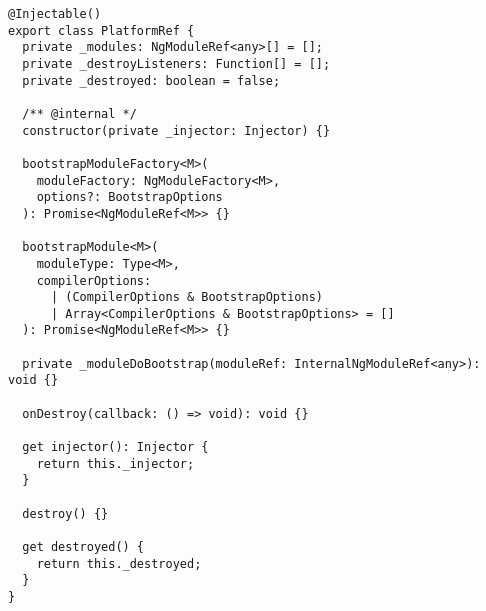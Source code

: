 \begin{verbatim}
@Injectable()
export class PlatformRef {
  private _modules: NgModuleRef<any>[] = [];
  private _destroyListeners: Function[] = [];
  private _destroyed: boolean = false;

  /** @internal */
  constructor(private _injector: Injector) {}

  bootstrapModuleFactory<M>(
    moduleFactory: NgModuleFactory<M>,
    options?: BootstrapOptions
  ): Promise<NgModuleRef<M>> {}

  bootstrapModule<M>(
    moduleType: Type<M>,
    compilerOptions:
      | (CompilerOptions & BootstrapOptions)
      | Array<CompilerOptions & BootstrapOptions> = []
  ): Promise<NgModuleRef<M>> {}

  private _moduleDoBootstrap(moduleRef: InternalNgModuleRef<any>): void {}

  onDestroy(callback: () => void): void {}

  get injector(): Injector {
    return this._injector;
  }

  destroy() {}

  get destroyed() {
    return this._destroyed;
  }
}
\end{verbatim}
